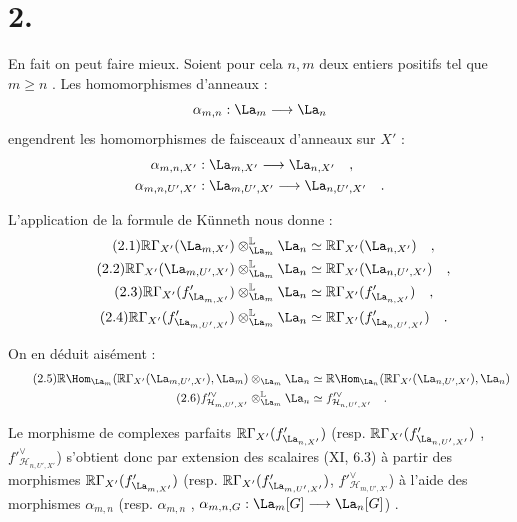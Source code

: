 \section*{2.}
En fait on peut faire mieux. Soient pour cela $n,m$ deux entiers positifs tel que $m \geq n$ . Les homomorphismes d'anneaux :
\[
\alpha_{m,n} : \La_m \longrightarrow \La_n
\]
engendrent les homomorphismes de faisceaux d'anneaux sur $X'$ :
\begin{align*}
\alpha_{m,n,X'} &: \La_{m,X'} \longrightarrow \La_{n,X'} \quad , \\
\alpha_{m,n,U',X'} &: \La_{m,U',X'} \longrightarrow \La_{n,U',X'} \quad .
\end{align*}

L'application de la formule de Künneth nous donne :
\begin{align}
\tag{2.1} \mathbb{R}\Gamma_{X'}(\La_{m,X'}) \otimes_{\La_m}^{\mathbb{L}} \La_n &\simeq \mathbb{R}\Gamma_{X'}(\La_{n,X'}) \quad , \\
\tag{2.2} \mathbb{R}\Gamma_{X'}(\La_{m,U',X'}) \otimes_{\La_m}^{\mathbb{L}} \La_n &\simeq \mathbb{R}\Gamma_{X'}(\La_{n,U',X'}) \quad , \\
\tag{2.3} \mathbb{R}\Gamma_{X'}(f'_{\La_{m,X'}}) \otimes_{\La_m}^{\mathbb{L}} \La_n &\simeq \mathbb{R}\Gamma_{X'}(f'_{\La_{n,X'}}) \quad , \\
\tag{2.4} \mathbb{R}\Gamma_{X'}(f'_{\La_{m,U',X'}}) \otimes_{\La_m}^{\mathbb{L}} \La_n &\simeq \mathbb{R}\Gamma_{X'}(f'_{\La_{n,U',X'}}) \quad .
\end{align}

On en déduit aisément :
\begin{align}
\tag{2.5} \mathbb{R}\Hom_{\La_m}(\mathbb{R}\Gamma_{X'}(\La_{m,U',X'}), \La_m) \otimes_{\La_m} \La_n &\simeq \mathbb{R}\Hom_{\La_n}(\mathbb{R}\Gamma_{X'}(\La_{n,U',X'}), \La_n) \\
\tag{2.6} f'^\vee_{\mathcal{H}_{m,U',X'}} \otimes_{\La_m}^{\mathbb{L}} \La_n &\simeq f'^\vee_{\mathcal{H}_{n,U',X'}} \quad .
\end{align}

Le morphisme de complexes parfaits $\mathbb{R}\Gamma_{X'}(f'_{\La_{n,X'}})$ (resp. $\mathbb{R}\Gamma_{X'}(f'_{\La_{n,U',X'}})$ , $f'^\vee_{\mathcal{H}_{n,U',X'}}$) s'obtient donc par extension des scalaires (XI, 6.3) à partir des morphismes $\mathbb{R}\Gamma_{X'}(f'_{\La_{m,X'}})$ (resp. $\mathbb{R}\Gamma_{X'}(f'_{\La_{m,U',X'}})$, $f'^\vee_{\mathcal{H}_{m,U',X'}}$) 
à l'aide des morphismes $\alpha_{m,n}$ (resp. $\alpha_{m,n}$ , $\alpha_{m,n,G} : \La_m[G] \longrightarrow \La_n[G]$) .

